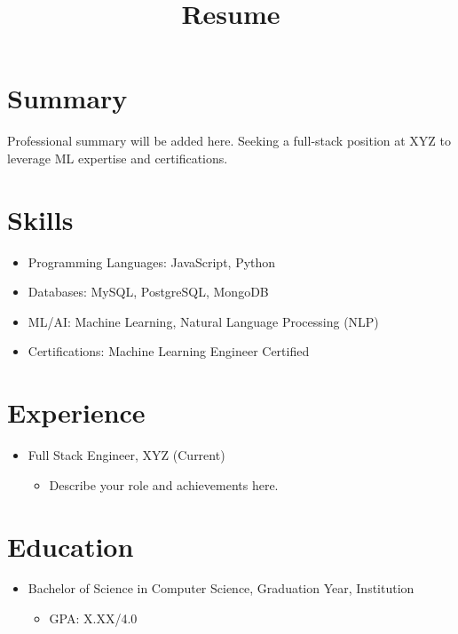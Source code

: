 \documentclass{resume}
\begin{document}

\title{Resume}

\begin{resume}

\section{Summary}
  Professional summary will be added here. Seeking a full-stack position at XYZ to leverage ML expertise and certifications.

\section{Skills}
\begin{itemize}
  \item Programming Languages: JavaScript, Python
  \item Databases: MySQL, PostgreSQL, MongoDB
  \item ML/AI: Machine Learning, Natural Language Processing (NLP)
  \item Certifications: Machine Learning Engineer Certified
\end{itemize}

\section{Experience}
\begin{itemize}
  \item Full Stack Engineer, XYZ (Current)
    \begin{itemize}[\normalfont\itshape]
      \item Describe your role and achievements here.
    \end{itemize}
\end{itemize}

\section{Education}
\begin{itemize}
  \item Bachelor of Science in Computer Science, Graduation Year, Institution
    \begin{itemize}
      \item GPA: X.XX/4.0
    \end{itemize}
\end{itemize}

\end{resume}
\end{document}
